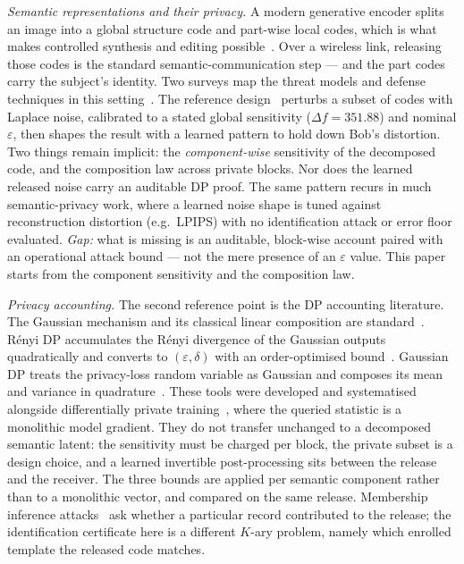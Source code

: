 \documentclass[10pt,twocolumn,letterpaper]{article}
\theoremstyle{plain}
\theoremstyle{definition}
\begin{document}
\emph{Semantic representations and their privacy.} A modern generative encoder splits an image into a global structure code and
part-wise local codes, which is what makes controlled synthesis and editing
possible~\cite{semanticstylegan}. Over a wireless link, releasing those codes is the standard
semantic-communication step --- and the part codes carry the subject's identity. Two
surveys map the threat models and defense techniques in this setting~\cite{semcomsurvey_won,semcomsurvey_meng}. The reference
design~\cite{arXiv2510} perturbs a subset of codes with Laplace noise, calibrated to a stated global
sensitivity ($\Delta f=351.88$) and nominal $\varepsilon$, then shapes the result with a learned pattern to hold
down Bob's distortion. Two things remain implicit: the \emph{component-wise} sensitivity of the decomposed
code, and the composition law across private blocks. Nor does the learned released noise
carry an auditable DP proof. The same pattern recurs in much semantic-privacy work,
where a learned noise shape is tuned against reconstruction distortion (e.g.\ LPIPS)
with no identification attack or error floor evaluated. \emph{Gap:} what is missing is an
auditable, block-wise account paired with an operational attack bound --- not the mere
presence of an $\varepsilon$ value. This paper starts from the component sensitivity and the
composition law.

\emph{Privacy accounting.} The second reference point is the DP accounting
literature. The Gaussian mechanism and its classical linear
composition are standard~\cite{dwork2014}. R\'enyi DP accumulates the
R\'enyi divergence of the Gaussian outputs quadratically and converts to
$(\varepsilon,\delta)$ with an order-optimised bound~\cite{mironov2017rdp}.
Gaussian DP treats the privacy-loss random variable as Gaussian and composes
its mean and variance in quadrature~\cite{dong2022gdp}. These tools were
developed and systematised alongside differentially private
training~\cite{abadi2016}, where the queried statistic is a monolithic model
gradient. They do not transfer unchanged to a decomposed semantic latent: the
sensitivity must be charged per block, the private subset is a design choice,
and a learned invertible post-processing sits between the release and the
receiver. The three bounds are applied per semantic component rather than to a
monolithic vector, and compared on the same release. Membership inference
attacks~\cite{shokri2017} ask whether a particular record contributed to the
release; the identification certificate here is a different $K$-ary problem,
namely which enrolled template the released code matches.
\end{document}
